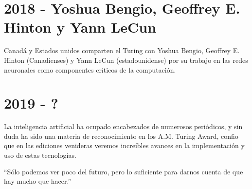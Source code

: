 \documentclass[notitlepage,letterpaper, 11pt]{article}
\begin{document}
\section*{2018 - Yoshua Bengio, Geoffrey E. Hinton y Yann LeCun}
\noindent Canadá y Estados unidos comparten el Turing con Yoshua Bengio, Geoffrey E. Hinton (Canadienses) y Yann LeCun (estadounidense) por su trabajo en las redes neuronales como componentes críticos de la computación.
\newline

\section*{2019 - ?}
\noindent La inteligencia artificial ha ocupado encabezados de numerosos periódicos, y sin duda ha sido una materia de reconocimiento en los A.M. Turing Award, confio que en las ediciones venideras veremos increíbles avances en la implementación y uso de estas tecnologías. 
\newline

``Sólo podemos ver poco del futuro, pero lo suficiente para darnos cuenta de que hay mucho que hacer.''

\end{document}
